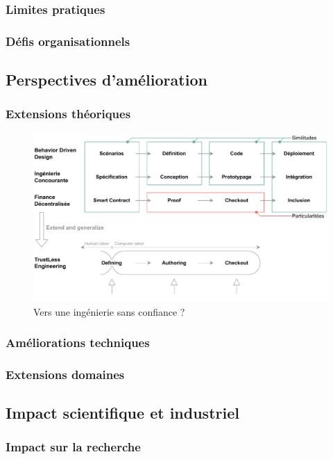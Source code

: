 \documentclass[a4paper,12pt]{article}
\begin{document}
\subsubsection{Limites pratiques}
\label{sec:org8f75426}
\subsubsection{Défis organisationnels}
\label{sec:orgb385434}
\subsection{Perspectives d'amélioration}
\label{sec:org27eacb8}
\subsubsection{Extensions théoriques}
\label{sec:org93d91dd}

\begin{figure}[htbp]
\centering
\includegraphics[width=.9\linewidth]{./svg/long-term-goal.pdf}
\caption{\label{fig:org9f2ee2b}Vers une ingénierie sans confiance ?}
\end{figure}
\subsubsection{Améliorations techniques}
\label{sec:orga6c76ba}
\subsubsection{Extensions domaines}
\label{sec:org533ba29}
\subsection{Impact scientifique et industriel}
\label{sec:org7597866}
\subsubsection{Impact sur la recherche}
\label{sec:orgc76d573}
\end{document}

